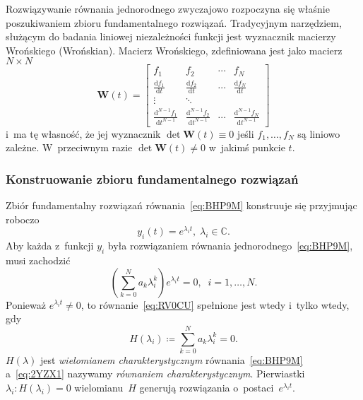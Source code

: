 \documentclass[paper=a4,DIV=12]{lpas}
\newcommand{\od}[2]{\frac{\mathrm{d}#1}{\mathrm{d}#2}}
\newcommand{\odn}[3]{\frac{\mathrm{d}^{#1}#2}{\mathrm{d}{#3}^{#1}}}
\begin{document}
Rozwiązywanie równania jednorodnego zwyczajowo rozpoczyna się właśnie
poszukiwaniem zbioru fundamentalnego rozwiązań. Tradycyjnym narzędziem,
służącym do badania liniowej niezależności funkcji jest wyznacznik macierzy
Wrońskiego (Wrońskian). Macierz Wrońskiego, zdefiniowana jest jako macierz
$N \times N$
\begin{equation}
  \mathbf{W}(t) = \begin{bmatrix}
    f_1               & f_2               & \cdots  & f_N               \\
    \od{f_1}{t}       & \od{f_2}{t}       & \cdots  & \od{f_N}{t}       \\
    \vdots            & \ddots            &         &                   \\
    \odn{N-1}{f_1}{t} & \odn{N-1}{f_2}{t} & \cdots  & \odn{N-1}{f_N}{t}
  \end{bmatrix}
  \label{eq:P191Z}
\end{equation}
i~ma tę własność, że jej wyznacznik $\det{\mathbf{W}(t)} \equiv 0$ jeśli $f_1, \dots,
f_N$ są liniowo zależne. W~przeciwnym razie $\det{\mathbf{W}(t)} \neq 0$
w~jakimś punkcie $t$.

\subsubsection{Konstruowanie zbioru fundamentalnego rozwiązań}
\label{sec:UV185}

Zbiór fundamentalny rozwiązań równania~\eqref{eq:BHP9M} konstruuje się
przyjmując roboczo
\begin{equation}
  y_i(t) = e^{\lambda_i t}, \; \lambda_i \in \mathbb{C}.
  \label{eq:JSZEN}
\end{equation}
Aby każda z~funkcji $y_i$ była rozwiązaniem równania jednorodnego~\eqref{eq:BHP9M},
musi zachodzić
\begin{equation}
  \left(\sum_{k = 0}^{N} a_k \lambda_i^k \right) e^{\lambda_i t} = 0,
  \;\; i = 1, \dots, N.
  \label{eq:RV0CU}
\end{equation}
Ponieważ $e^{\lambda_i t} \neq 0$, to równanie~\eqref{eq:RV0CU} spełnione jest
wtedy i~tylko wtedy, gdy
\begin{equation}
  H(\lambda_i) \coloneqq \sum_{k = 0}^{N} a_k \lambda_i^k = 0.
  \label{eq:2YZX1}
\end{equation}
$H\left(\lambda\right)$ jest {\em wielomianem charakterystycznym}
równania~\eqref{eq:BHP9M} a~\eqref{eq:2YZX1} nazywamy {\em równaniem
charakterystycznym}. Pierwiastki $\lambda_i: H\left(\lambda_i\right) = 0$
wielomianu~$H$ generują rozwiązania o~postaci~$e^{\lambda_i t}$.
\end{document}
